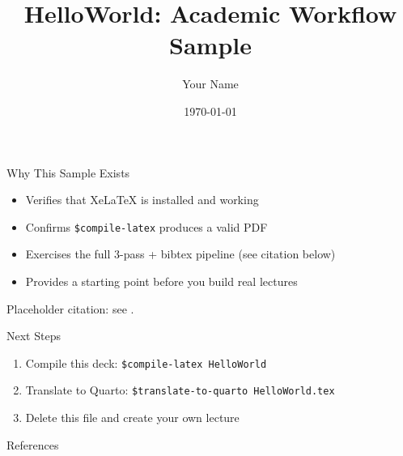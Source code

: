 \documentclass{beamer}
\title{HelloWorld: Academic Workflow Sample}
\author{Your Name}
\institute{Your Institution}
\date{\today}
\begin{document}
\frame{\titlepage}

\begin{frame}{Why This Sample Exists}
    \begin{itemize}
        \item Verifies that XeLaTeX is installed and working
        \item Confirms \texttt{\$compile-latex} produces a valid PDF
        \item Exercises the full 3-pass + bibtex pipeline (see citation below)
        \item Provides a starting point before you build real lectures
    \end{itemize}
    Placeholder citation: see \cite{Example2024_book}.
\end{frame}

\begin{frame}{Next Steps}
    \begin{enumerate}
        \item Compile this deck: \texttt{\$compile-latex HelloWorld}
        \item Translate to Quarto: \texttt{\$translate-to-quarto HelloWorld.tex}
        \item Delete this file and create your own lecture
    \end{enumerate}
\end{frame}

\begin{frame}{References}
    
    
\end{frame}
\end{document}
